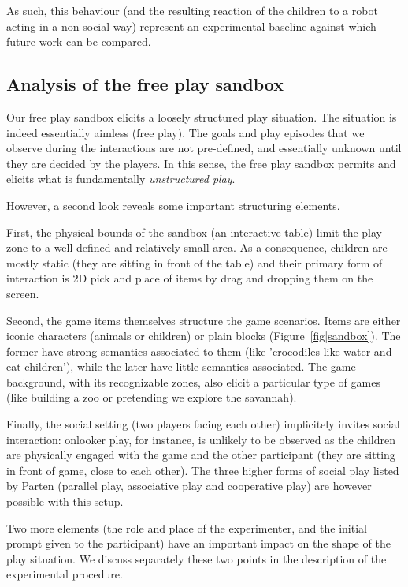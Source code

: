 \documentclass{article}
\begin{document}
As such, this behaviour (and the resulting reaction of the children to a
robot acting in a non-social way) represent an experimental baseline against which
future work can be compared.


\subsection{Analysis of the free play sandbox}

Our free play sandbox elicits a loosely structured play situation. The
situation is indeed essentially aimless (free play). The goals and play episodes
that we observe during the interactions are not pre-defined, and essentially
unknown until they are decided by the players. In this sense, the free play
sandbox permits and elicits what is fundamentally \emph{unstructured play}.

However, a second look reveals some important structuring elements.

First, the physical bounds of the sandbox (an interactive table) limit the
play zone to a well defined and relatively small area. As a consequence,
children are mostly static (they are sitting in front of the table) and their
primary form of interaction is 2D pick and place of items by drag and dropping
them on the screen.

Second, the game items themselves structure the game scenarios. Items are either
iconic characters (animals or children) or plain blocks
(Figure~\ref{fig|sandbox}). The former have strong semantics associated to them
(like 'crocodiles like water and eat children'), while the later have little
semantics associated. The game background, with its recognizable zones, also
elicit a particular type of games (like building a zoo or pretending we explore
the savannah).

Finally, the social setting (two players facing each other) implicitely invites
social interaction: onlooker play, for instance, is unlikely to be observed as
the children are physically engaged with the game and the other participant
(they are sitting in front of game, close to each other). The three higher forms
of social play listed by Parten (parallel play, associative play and cooperative
play) are however possible with this setup.


Two more elements (the role and place of the experimenter, and the initial
prompt given to the participant) have an important impact on the shape of the
play situation. We discuss separately these two points in the description of the
experimental procedure.
\end{document}
